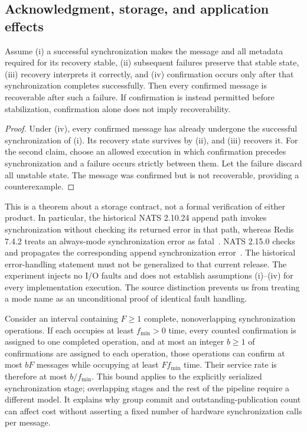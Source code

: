 \subsection{Acknowledgment, storage, and application effects}

\begin{proposition}\label{prop:storage}
Assume (i) a successful synchronization makes the message and all metadata required for its recovery stable, (ii) subsequent failures preserve that stable state, (iii) recovery interprets it correctly, and (iv) confirmation occurs only after that synchronization completes successfully. Then every confirmed message is recoverable after such a failure. If confirmation is instead permitted before stabilization, confirmation alone does not imply recoverability.
\end{proposition}
\begin{proof}
Under (iv), every confirmed message has already undergone the successful synchronization of (i). Its recovery state survives by (ii), and (iii) recovers it. For the second claim, choose an allowed execution in which confirmation precedes synchronization and a failure occurs strictly between them. Let the failure discard all unstable state. The message was confirmed but is not recoverable, providing a counterexample.
\end{proof}

This is a theorem about a storage contract, not a formal verification of either product. In particular, the historical NATS 2.10.24 append path invokes synchronization without checking its returned error in that path, whereas Redis 7.4.2 treats an always-mode synchronization error as fatal~\cite{nats21024filestore,redis742aof}. NATS 2.15.0 checks and propagates the corresponding append synchronization error~\cite{nats2150filestore}. The historical error-handling statement must not be generalized to that current release. The experiment injects no I/O faults and does not establish assumptions (i)--(iv) for every implementation execution. The source distinction prevents us from treating a mode name as an unconditional proof of identical fault handling.

Consider an interval containing $F\geq1$ complete, nonoverlapping synchronization operations. If each occupies at least $f_{\min}>0$ time, every counted confirmation is assigned to one completed operation, and at most an integer $b\geq1$ of confirmations are assigned to each operation, those operations can confirm at most $bF$ messages while occupying at least $Ff_{\min}$ time. Their service rate is therefore at most $b/f_{\min}$. This bound applies to the explicitly serialized synchronization stage; overlapping stages and the rest of the pipeline require a different model. It explains why group commit and outstanding-publication count can affect cost without asserting a fixed number of hardware synchronization calls per message.

